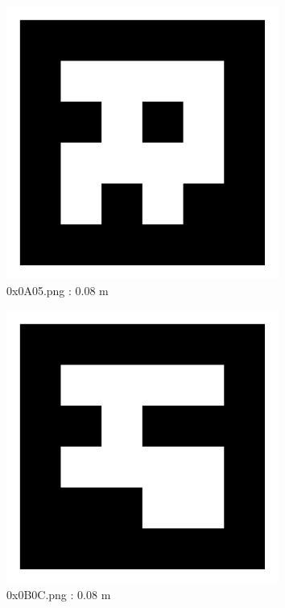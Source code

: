 \documentclass[11pt,a4,BCOR=0cm]{scrartcl}
\begin{document}
\begin{figure}
  \centering
    \includegraphics[width=8.955cm]{0x0A05.pdf}
    \caption{0x0A05.png : 0.08 m}
    \label{fig:0x0A05.pdf}
  
\end{figure} 

\begin{figure}
  \centering
    \includegraphics[width=8.955cm]{0x0B0C.pdf}
    \caption{0x0B0C.png : 0.08 m}
    \label{fig:0x0B0C.pdf}
  
\end{figure} 

\clearpage
\end{document}
